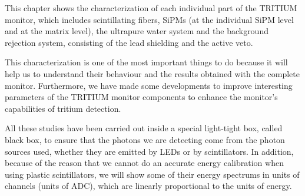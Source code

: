 This chapter shows the characterization of each individual part of the TRITIUM monitor, which includes scintillating fibers, SiPMs (at the individual SiPM level and at the matrix level), the ultrapure water system and the background rejection system, consisting of the lead shielding and the active veto. 

This characterization is one of the most important things to do because it will help us to understand their behaviour and the results obtained with the complete monitor. Furthermore, we have made some developments to improve interesting parameters of the TRITIUM monitor components to enhance the monitor's capabilities of tritium detection.

All these studies have been carried out inside a special light-tight box, called black box, to ensure that the photons we are detecting come from the photon sources used, whether they are emitted by LEDs or by scintillators. In addition, because of the reason that we cannot do an accurate energy calibration when using plastic scintillators, we will show some of their energy spectrums in units of channels (units of ADC), which are linearly proportional to the units of energy.